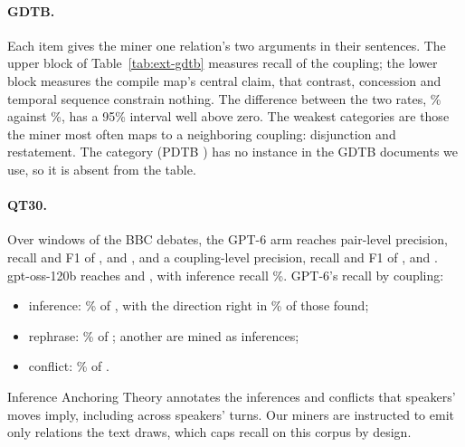 \paragraph{GDTB.} Each item gives the miner one relation's two arguments in their sentences. The
upper block of Table~\ref{tab:ext-gdtb} measures recall of the coupling; the lower block measures
the compile map's central claim, that contrast, concession and temporal sequence constrain
nothing. The difference between the two rates, \extGdCorrectGpt\% against \extGdNoneGpt\%, has a
95\% interval well above zero. The weakest categories are those the miner most often maps to a
neighboring coupling: disjunction and restatement. The  category
(PDTB ) has no instance in the GDTB documents we use, so it is
absent from the table.

\paragraph{QT30.} Over \extQtWindows{} windows of the BBC debates, the GPT-6 arm reaches
pair-level precision, recall and F1 of \extQtPairPGpt, \extQtPairRGpt{} and \extQtPairFGpt, and a
coupling-level precision, recall and F1 of \extQtCoupPGpt, \extQtCoupRGpt{} and \extQtCoupFGpt.
gpt-oss-120b reaches \extQtPairFOss{} and \extQtCoupFOss, with
inference recall \extQtRecEntailmentOss\%. GPT-6's recall by coupling:
\begin{itemize}[leftmargin=1.2em,itemsep=1pt,topsep=2pt]
\item inference: \extQtRecEntailmentGpt\% of \extQtNEntailment, with the direction right in
  \extQtDirGpt\% of those found;
\item rephrase: \extQtRecEquivalenceGpt\% of \extQtNEquivalence; another \extQtEqvAsEnt{} are
  mined as inferences;
\item conflict: \extQtRecContradictionGpt\% of \extQtNContradiction.
\end{itemize}
Inference Anchoring Theory annotates the inferences and conflicts that speakers' moves imply,
including across speakers' turns. Our miners are instructed to emit only relations
the text draws, which caps recall on this corpus by design.

